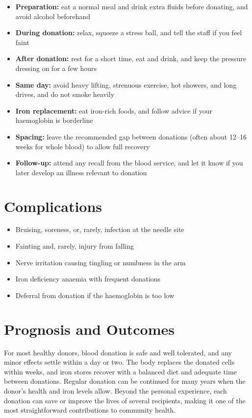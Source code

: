 \begin{itemize}
    \item \textbf{Preparation:} eat a normal meal and drink extra fluids before donating, and avoid alcohol beforehand
    \item \textbf{During donation:} relax, squeeze a stress ball, and tell the staff if you feel faint
    \item \textbf{After donation:} rest for a short time, eat and drink, and keep the pressure dressing on for a few hours
    \item \textbf{Same day:} avoid heavy lifting, strenuous exercise, hot showers, and long drives, and do not smoke heavily
    \item \textbf{Iron replacement:} eat iron-rich foods, and follow advice if your haemoglobin is borderline
    \item \textbf{Spacing:} leave the recommended gap between donations (often about 12--16 weeks for whole blood) to allow full recovery
    \item \textbf{Follow-up:} attend any recall from the blood service, and let it know if you later develop an illness relevant to donation
\end{itemize}

\section*{Complications}
\begin{itemize}
    \item Bruising, soreness, or, rarely, infection at the needle site
    \item Fainting and, rarely, injury from falling
    \item Nerve irritation causing tingling or numbness in the arm
    \item Iron deficiency anaemia with frequent donations
    \item Deferral from donation if the haemoglobin is too low
\end{itemize}

\section*{Prognosis and Outcomes}
For most healthy donors, blood donation is safe and well tolerated, and any minor effects settle within a day or two. The body replaces the donated cells within weeks, and iron stores recover with a balanced diet and adequate time between donations. Regular donation can be continued for many years when the donor's health and iron levels allow. Beyond the personal experience, each donation can save or improve the lives of several recipients, making it one of the most straightforward contributions to community health.

